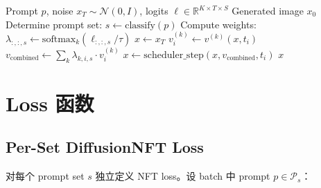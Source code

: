 \documentclass[11pt,a4paper]{article}
\newcommand{\R}{\mathbb{R}}
\newcommand{\N}{\mathcal{N}}
\newcommand{\softmax}{\mathrm{softmax}}
\theoremstyle{definition}
\begin{document}
\begin{algorithm}[H]
\caption{Per-Set MoF Inference}
\label{alg:inference}
\begin{algorithmic}[1]
\Require Prompt $p$, noise $x_T \sim \N(0, I)$, logits $\ell \in \R^{K \times T \times S}$
\Ensure Generated image $x_0$
\State Determine prompt set: $s \gets \mathrm{classify}(p)$
\State Compute weights: $\lambda_{:,:,s} \gets \softmax_k(\ell_{:,:,s} / \tau)$ 
\State $x \gets x_T$
        \State $v^{(k)}_i \gets v^{(k)}(x, t_i)$ 
    \EndFor
    \State $v_{\mathrm{combined}} \gets \sum_k \lambda_{k,i,s} \cdot v^{(k)}_i$ 
    \State $x \gets \mathrm{scheduler\_step}(x, v_{\mathrm{combined}}, t_i)$ 
\EndFor
\State \Return $x$
\end{algorithmic}
\end{algorithm}

\section{Loss 函数}
\label{sec:loss}

\subsection{Per-Set DiffusionNFT Loss}

对每个 prompt set $s$ 独立定义 NFT loss。设 batch 中 prompt $p \in \mathcal{P}_s$：
\end{document}
